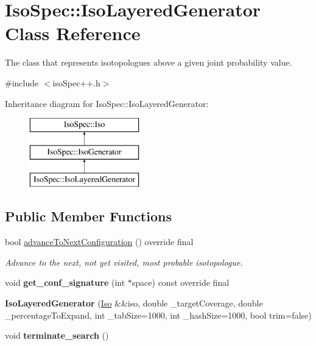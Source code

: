 \hypertarget{class_iso_spec_1_1_iso_layered_generator}{}\section{Iso\+Spec\+:\+:Iso\+Layered\+Generator Class Reference}
\label{class_iso_spec_1_1_iso_layered_generator}


The class that represents isotopologues above a given joint probability value.  




{\ttfamily \#include $<$iso\+Spec++.\+h$>$}

Inheritance diagram for Iso\+Spec\+:\+:Iso\+Layered\+Generator\+:\begin{figure}[H]
\begin{center}
\leavevmode
\includegraphics[height=3.000000cm]{class_iso_spec_1_1_iso_layered_generator}
\end{center}
\end{figure}
\subsection*{Public Member Functions}
\begin{DoxyCompactItemize}
\item 
bool \mbox{\hyperlink{class_iso_spec_1_1_iso_layered_generator_abce0871ac279fd54a0344ceb80126b66}{advance\+To\+Next\+Configuration}} () override final
\begin{DoxyCompactList}\small\item\em Advance to the next, not yet visited, most probable isotopologue. \end{DoxyCompactList}\item 
\mbox{\label{class_iso_spec_1_1_iso_layered_generator_ab63cbae392f88528e5b7421dada4abef}} 
void {\bfseries get\+\_\+conf\+\_\+signature} (int $\ast$space) const override final
\item 
\mbox{\label{class_iso_spec_1_1_iso_layered_generator_a746fc9fe13cca843a0f0f1993aee970a}} 
{\bfseries Iso\+Layered\+Generator} (\mbox{\hyperlink{class_iso_spec_1_1_iso}{Iso}} \&\&iso, double \+\_\+target\+Coverage, double \+\_\+percentage\+To\+Expand, int \+\_\+tab\+Size=1000, int \+\_\+hash\+Size=1000, bool trim=false)
\item 
\mbox{\label{class_iso_spec_1_1_iso_layered_generator_a6c4ea5906136d802859f47cd1b5add8d}} 
void {\bfseries terminate\+\_\+search} ()
\end{DoxyCompactItemize}
